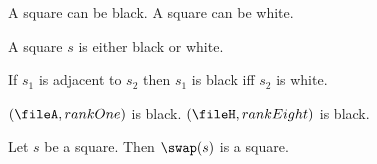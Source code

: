 \begin{signature}
   A square can be black.
   A square can be white.
\end{signature}

\begin{axiom}
   A square $s$ is either black or white.
\end{axiom}

\begin{axiom}
   If $s_1$ is adjacent to $s_2$
   then $s_1$ is black iff $s_2$ is white.
\end{axiom}

\begin{axiom}
   $(\fileA, rankOne)$ is black.
   $(\fileH, rankEight)$ is black.
\end{axiom}


\begin{signature}
   Let $s$ be a square.
   Then $\swap(s)$ is a square.
\end{signature}

